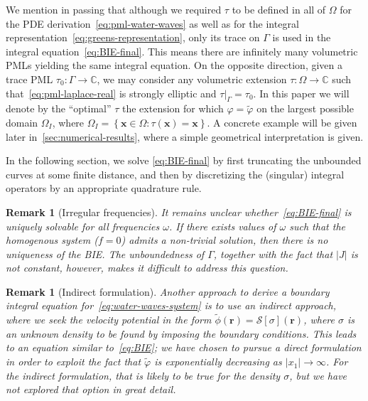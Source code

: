 \documentclass[11pt]{article}
\newcommand{\C}{\mathbb{C}}
\newcommand{\bx}{\mathbf{x}}
\newcommand{\br}{\boldsymbol{r}}
\newcommand{\tvarphi}{\tilde \varphi}
\newtheorem{remark}[theorem]{Remark}
\begin{document}
We mention in passing that although we required $\tau$ to be defined in all of
$\Omega$ for the PDE derivation~\cref{eq:pml-water-waves} as well as for the
integral representation~\cref{eq:greens-representation}, only its trace on
$\Gamma$ is used in the integral equation~\cref{eq:BIE-final}. This means there
are infinitely many volumetric PMLs yielding the same integral equation. On the
opposite direction, given a trace PML $\tau_0 : \Gamma \to \C$, we may consider
any volumetric extension $\tau : \Omega \to \C$ such
that~\cref{eq:pml-laplace-real} is strongly elliptic and $\tau|_{\Gamma} =
\tau_0$. In this paper we will denote by the ``optimal'' $\tau$ the extension
for which $\varphi = \tvarphi$ on the largest possible domain $\Omega_I$, where
$\Omega_I = \left\{ \bx \in \Omega : \tau(\bx) = \bx \right\}$. A concrete
example will be given later in~\cref{sec:numerical-results}, where a simple
geometrical interpretation is given.



In the following section, we solve \cref{eq:BIE-final} by first truncating the
unbounded curves at some finite distance, and then by discretizing the
(singular) integral operators by an appropriate quadrature rule. 

\begin{remark}[Irregular frequencies]
  It remains unclear whether~\cref{eq:BIE-final} is uniquely solvable for all
  frequencies $\omega$. If there exists values of $\omega$ such that the
  homogenous system ($f=0$) admits a non-trivial solution, then there is no
  uniqueness of the BIE. The unboundedness of $\Gamma$, together with the fact
  that $|J|$ is not constant, however, makes it difficult to address this
  question.
\end{remark}

\begin{remark}[Indirect formulation]
  Another approach to derive a boundary integral equation
  for~\cref{eq:water-waves-system} is to use an \emph{indirect} approach, where
  we seek the velocity potential in the form $\tilde{\phi}(\br) =
  \mathcal{S}[\sigma](\br)$, where $\sigma$ is an unknown density to be found by
  imposing the boundary conditions. This leads to an equation similar
  to~\cref{eq:BIE}; we have chosen to pursue a \emph{direct} formulation in
  order to exploit the fact that $\tvarphi$ is exponentially decreasing as
  $|x_1| \to \infty$. For the indirect formulation, that is likely to be true
  for the density $\sigma$, but we have not explored that option in great
  detail. 
\end{remark}
\end{document}
